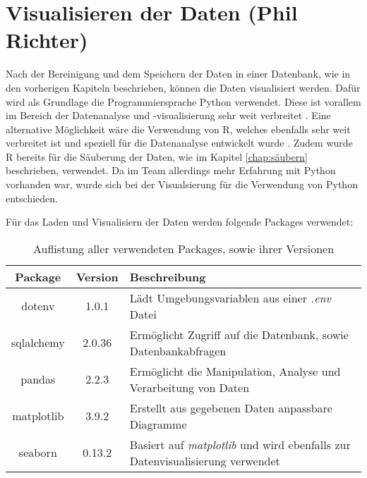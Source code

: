 \chapter{Visualisieren der Daten (Phil Richter)}
Nach der Bereinigung und dem Speichern der Daten in einer Datenbank, wie in den vorherigen Kapiteln beschrieben, können die Daten visualisiert werden. Dafür wird als Grundlage
die Programmiersprache Python verwendet. Diese ist vorallem im Bereich der Datenanalyse und -visualisierung sehr weit verbreitet \cite{noauthor_most_nodate, noauthor_popular_nodate}.
Eine alternative Möglichkeit wäre die Verwendung von R, welches ebenfalls sehr weit verbreitet ist und speziell für die Datenanalyse entwickelt wurde \cite{noauthor_r_nodate}.
Zudem wurde R bereits für die Säuberung der Daten, wie im Kapitel \ref{chap:säubern} beschrieben, verwendet. Da im Team allerdings mehr Erfahrung mit Python vorhanden war,
wurde sich bei der Visualsierung für die Verwendung von Python entschieden.

Für das Laden und Visualisiern der Daten werden folgende Packages verwendet:
\begin{table}[h!]
    \centering
    \begin{tabularx}{\textwidth}{|c|c|>{\centering\arraybackslash}X|}
        \hline
        \textbf{Package} & \textbf{Version} & \textbf{Beschreibung} \\ \hline
        dotenv & 1.0.1 & Lädt Umgebungsvariablen aus einer \textit{.env} Datei \\ \hline
        sqlalchemy & 2.0.36 & Ermöglicht Zugriff auf die Datenbank, sowie Datenbankabfragen \\ \hline
        pandas & 2.2.3 & Ermöglicht die Manipulation, Analyse und Verarbeitung von Daten \\ \hline
        matplotlib & 3.9.2 & Erstellt aus gegebenen Daten anpassbare Diagramme \\ \hline
        seaborn & 0.13.2 & Basiert auf \textit{matplotlib} und wird ebenfalls zur Datenvisualisierung verwendet \\ \hline
    \end{tabularx}
    \caption{Auflistung aller verwendeten Packages, sowie ihrer Versionen}
\end{table}


